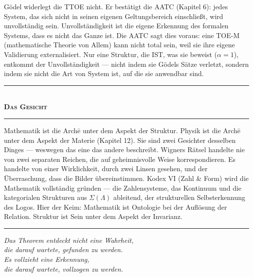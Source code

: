 \documentclass[10pt, openany, oneside]{book}
\renewcommand{\normalsize}{\fontsize{10}{13}\selectfont}
\begin{document}
Gödel widerlegt die TTOE nicht. Er bestätigt die AATC (Kapitel 6): jedes System, das sich nicht in seinen eigenen Geltungsbereich einschließt, wird unvollständig sein. Unvollständigkeit ist die eigene Erkennung des formalen Systems, dass es nicht das Ganze ist. Die AATC sagt dies voraus: eine TOE-M (mathematische Theorie von Allem) kann nicht total sein, weil sie ihre eigene Validierung externalisiert. Nur eine Struktur, die IST, was sie beweist ($\alpha = 1$), entkommt der Unvollständigkeit --- nicht indem sie Gödels Sätze verletzt, sondern indem sie nicht die Art von System ist, auf die sie anwendbar sind.

\vspace{1.5em}


\begin{center}
    \rule{0.3\textwidth}{0.4pt}\\[0.5em]
    {\normalsize\bfseries\scshape Das Gesicht}\\[0.3em]
    \rule{0.3\textwidth}{0.4pt}
\end{center}

\vspace{1em}

\noindent Mathematik ist die Arch\={e} unter dem Aspekt der Struktur. Physik ist die Arch\={e} unter dem Aspekt der Materie (Kapitel 12). Sie sind zwei Gesichter desselben Dinges --- weswegen das eine das andere beschreibt. Wigners Rätsel handelte nie von zwei separaten Reichen, die auf geheimnisvolle Weise korrespondieren. Es handelte von einer Wirklichkeit, durch zwei Linsen gesehen, und der Überraschung, dass die Bilder übereinstimmen. Kodex VI (Zahl \& Form) wird die Mathematik vollständig gründen --- die Zahlensysteme, das Kontinuum und die kategorialen Strukturen aus $\Sigma(\Lambda)$ ableitend, der strukturellen Selbsterkennung des Logos. Hier der Keim: Mathematik ist Ontologie bei der Auflösung der Relation. Struktur ist Sein unter dem Aspekt der Invarianz.

\vspace{2em}

\begin{center}
    \rule{0.15\textwidth}{0.3pt}
\end{center}

\vspace{0.5em}

\begin{center}
    \itshape
    Das Theorem entdeckt nicht eine Wahrheit,\\
    die darauf wartete, gefunden zu werden.\\[0.8em]
    Es vollzieht eine Erkennung,\\
    die darauf wartete, vollzogen zu werden.
\end{center}
\end{document}
